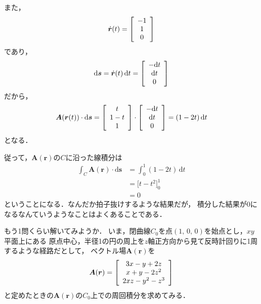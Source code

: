 また，
\begin{align*}
\dot{ \bm{r} } (t) = \left[
\renewcommand{\arraystretch}{1}
\begin{array}{c}
-1 \\
1 \\
0
\end{array}
\right]
\end{align*}
であり，
\begin{align*}
\mathrm{d}\bm{s} = \dot{ \bm{r}}(t) \, \mathrm{d}t =\left[
\renewcommand{\arraystretch}{1}
\begin{array}{c}
- \mathrm{d} t \\
\mathrm{d} t \\
0
\end{array}
\right]
\end{align*}
だから，
\begin{align*}
\bm{A} (\bm{r}(t)) \cdot \mathrm{d}\bm{s}
= \left[
\renewcommand{\arraystretch}{1}
\begin{array}{c} 
t \\
1-t \\
1
\end{array}
\right] \cdot \left[
\renewcommand{\arraystretch}{1}
\begin{array}{c}
- \mathrm{d}t \\
\mathrm{d} t \\
0
\end{array}
\right]
= ( 1 -2t ) \, \mathrm{d} t 
\end{align*}
となる．

従って，$\bm{A}(\bm{r})$の$C$に沿った線積分は
\begin{align*}
\int_C \bm{A}(\bm{r}) \cdot \mathrm{d} \bm{s} & =
\int_0^1 (1 - 2t ) \, \mathrm{d} t \\
& = \biggl[ t - t^2  \biggr]_0^1 \\
& =0
\end{align*}
ということになる．なんだか拍子抜けするような結果だが，
積分した結果が0になるなんていうようなことはよくあることである．

もう1問くらい解いてみようか．
いま，閉曲線$C_0$を点$(1, \, 0, \, 0)$を始点とし，$xy$平面上にある
原点中心，半径1の円の周上を$z$軸正方向から見て反時計回りに1周するような経路だとして，
ベクトル場$\bm{A}(\bm{r})$を
\begin{align*}
\bm{A} ( \bm{r} ) = \left[
\renewcommand{\arraystretch}{1}
\begin{array}{c}
3x - y + 2z \\
x + y -2z^2 \\
2xz - y^2 - z^3
\end{array}
\right]
\end{align*}
と定めたときの$\bm{A}(\bm{r})$の$C_0$上での周回積分を求めてみる．

